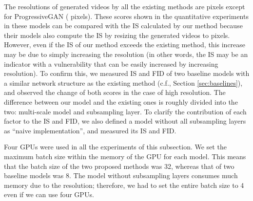 \documentclass[twocolumn]{svjour3}
\def\Sec#1{Section \ref{sec:#1}}
\begin{document}
The resolutions of generated videos by all the existing methods are  pixels
except for ProgressiveGAN ( pixels).
These scores shown in the quantitative experiments in these models can be compared with
the IS calculated by our method because their models also compute the IS
by resizing the generated videos to  pixels.
However, even if the IS of our method exceeds the existing method,
this increase may be due to simply increasing the resolution
(in other words, the IS may be an indicator with a vulnerability that can be easily increased by increasing resolution).
To confirm this, we measured IS and FID of two baseline models
with a similar network structure as the existing method (c.f., \Sec{baselines}),
and observed the change of both scores in the case of high resolution.
The difference between our model and the existing ones is roughly divided into the two:
multi-scale model and subsampling layer.
To clarify the contribution of each factor to the IS and FID,
we also defined a model without all subsampling layers as
``naive implementation'', and measured its IS and FID.






Four GPUs were used in all the experiments of this subsection.
We set the maximum batch size within the memory of the GPU for each model.
This means that the batch size of the two proposed methods was 32,
whereas that of two baseline models was 8.
The model without subsampling layers consumes much memory due to the resolution;
therefore, we had to set the entire batch size to 4 even if we can use four GPUs.
\end{document}
